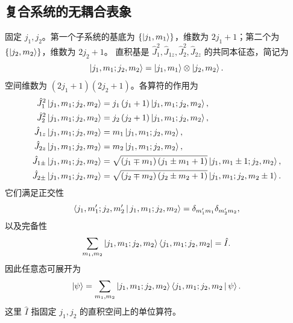 \subsection{复合系统的无耦合表象}
固定 $j_1,j_2$。第一个子系统的基底为 $\left\{\Ket{j_1,m_1}\right\}$，维数为 $2j_1+1$；第二个为 $\left\{\Ket{j_2,m_2}\right\}$，维数为 $2j_2+1$。
直积基是 $\hat J_1^2,\hat J_{1z},\hat J_2^2,\hat J_{2z}$ 的共同本征态，简记为
\begin{equation}
\Ket{j_1,m_1;j_2,m_2}
=\Ket{j_1,m_1}\otimes\Ket{j_2,m_2}.
\end{equation}
空间维数为 $\left(2j_1+1\right)\left(2j_2+1\right)$。各算符的作用为
\begin{align}
\hat J_1^2\Ket{j_1,m_1;j_2,m_2}
&=j_1\left(j_1+1\right)\Ket{j_1,m_1;j_2,m_2},\\
\hat J_2^2\Ket{j_1,m_1;j_2,m_2}
&=j_2\left(j_2+1\right)\Ket{j_1,m_1;j_2,m_2},\\
\hat J_{1z}\Ket{j_1,m_1;j_2,m_2}
&=m_1\Ket{j_1,m_1;j_2,m_2},\\
\hat J_{2z}\Ket{j_1,m_1;j_2,m_2}
&=m_2\Ket{j_1,m_1;j_2,m_2},\\
\hat J_{1\pm}\Ket{j_1,m_1;j_2,m_2}
&=\sqrt{\left(j_1\mp m_1\right)\left(j_1\pm m_1+1\right)}
\Ket{j_1,m_1\pm1;j_2,m_2},\\
\hat J_{2\pm}\Ket{j_1,m_1;j_2,m_2}
&=\sqrt{\left(j_2\mp m_2\right)\left(j_2\pm m_2+1\right)}
\Ket{j_1,m_1;j_2,m_2\pm1}.
\end{align}
它们满足正交性
\begin{equation}
\Braket{j_1,m_1';j_2,m_2'|j_1,m_1;j_2,m_2}
=\delta_{m_1'm_1}\delta_{m_2'm_2},
\end{equation}
以及完备性
\begin{equation}
\sum_{m_1,m_2}\Ket{j_1,m_1;j_2,m_2}\Bra{j_1,m_1;j_2,m_2}=\hat I.
\end{equation}
因此任意态可展开为
\begin{equation}
\Ket{\psi}=\sum_{m_1,m_2}\Ket{j_1,m_1;j_2,m_2}
\Braket{j_1,m_1;j_2,m_2|\psi}.
\end{equation}
这里 $\hat I$ 指固定 $j_1,j_2$ 的直积空间上的单位算符。

